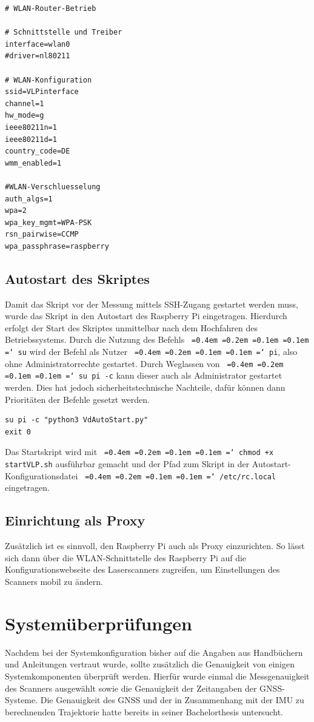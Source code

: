 \documentclass[a4paper,12pt,bibliography=totoc, listof=totoc,titlepage,pointlessnumbers]{scrreprt}
\newcommand*\justify{%
  \fontdimen2\font=0.4em%
  \fontdimen3\font=0.2em%
  \fontdimen4\font=0.1em%
  \fontdimen7\font=0.1em%
  \hyphenchar\font=`\-%
}
\newcommand{\code}[1]{\texttt{\justify{#1}}}
\begin{document}
\begin{lstlisting}[caption={Konfiguration der \code{/etc/hostapd/hostapd.conf}}, label={hostapd}]
# WLAN-Router-Betrieb

# Schnittstelle und Treiber
interface=wlan0
#driver=nl80211

# WLAN-Konfiguration
ssid=VLPinterface
channel=1
hw_mode=g
ieee80211n=1
ieee80211d=1
country_code=DE
wmm_enabled=1

#WLAN-Verschluesselung
auth_algs=1
wpa=2
wpa_key_mgmt=WPA-PSK
rsn_pairwise=CCMP
wpa_passphrase=raspberry
\end{lstlisting}


\section{Autostart des Skriptes}
Damit das Skript vor der Messung mittels SSH-Zugang gestartet werden muss, wurde das Skript in den Autostart des Raspberry Pi eingetragen. Hierdurch erfolgt der Start des Skriptes unmittelbar nach dem Hochfahren des Betriebssystems. Durch die Nutzung des Befehls \code{su} wird der Befehl als Nutzer \code{pi}, also ohne Administratorrechte gestartet. Durch Weglassen von \code{su pi -c} kann dieser auch als Administrator gestartet werden. Dies hat jedoch sicherheitstechnische Nachteile, dafür können dann Prioritäten der Befehle gesetzt werden.

\begin{lstlisting}[caption={Startskript startVLP.sh}, label={startskript}]
su pi -c "python3 VdAutoStart.py"
exit 0
\end{lstlisting}

Das Startskript wird mit \code{chmod +x startVLP.sh} ausführbar gemacht und der Pfad zum Skript in der Autostart-Konfigurationsdatei \code{/etc/rc.local} eingetragen.

\section{Einrichtung als Proxy}
Zusätzlich ist es sinnvoll, den Raspberry Pi auch als Proxy einzurichten. So lässt sich dann über die WLAN-Schnittstelle des Raspberry Pi auf die Konfigurationswebseite  des Laserscanners zugreifen, um Einstellungen des Scanners mobil zu ändern.


\chapter{Systemüberprüfungen}
\label{c:systemueberpruefung}
Nachdem bei der Systemkonfiguration bisher auf die Angaben aus Handbüchern und Anleitungen vertraut wurde, sollte zusätzlich die Genauigkeit von einigen Systemkomponenten überprüft werden. Hierfür wurde einmal die Messgenauigkeit des Scanners ausgewählt sowie die Genauigkeit der Zeitangaben der GNSS-Systeme. Die Genauigkeit des GNSS und der in Zusammenhang mit der IMU zu berechnenden Trajektorie hatte bereits \citet{wilken} in seiner Bachelorthesis untersucht.
\end{document}
